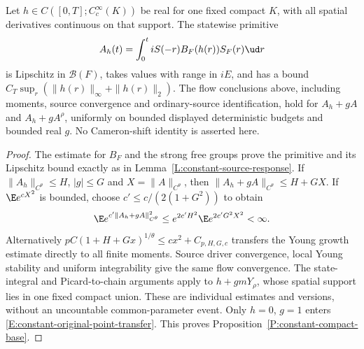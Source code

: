 \begin{proposition}\label{P:constant-compact-base}
  Let $h\in C([0,T];C_c^\infty(K))$ be real for one fixed compact
  $K$, with all spatial derivatives continuous on that support.
  The statewise primitive
  \[
    A_h(t)=\int_0^t iS(-r)B_F(h(r))S_F(r)\ud r
  \]
  is Lipschitz in $\mathcal B(F)$, takes values with range in $iE$,
  and has a bound $C_T\sup_r(\|h(r)\|_\infty+\|h(r)\|_2)$.
  The flow conclusions above, including moments, source convergence
  and ordinary-source identification, hold for $A_h+gA$ and
  $A_h+gA^\rho$, uniformly on bounded displayed deterministic budgets
  and bounded real $g$. No Cameron-shift identity is asserted here.
\end{proposition}

\begin{proof}
  The estimate for $B_F$ and the strong free groups prove the primitive
  and its Lipschitz bound exactly as in
  Lemma~\ref{L:constant-source-response}. If
  $\|A_h\|_{C^\theta}\le H$, $|g|\le G$ and $X=\|A\|_{C^\theta}$,
  then $\|A_h+gA\|_{C^\theta}\le H+GX$. If $\E e^{cX^2}$ is bounded,
  choose $c'\le c/(2(1+G^2))$ to obtain
  \[
    \E e^{c'\|A_h+gA\|_{C^\theta}^2}
    \le e^{2c'H^2}\E e^{2c'G^2X^2}<\infty.
  \]
  Alternatively $pC(1+H+Gx)^{1/\theta}\le cx^2+C_{p,H,G,c}$
  transfers the Young growth estimate directly to all finite moments.
  Source driver convergence, local Young stability and uniform
  integrability give the same flow convergence. The state-integral
  and Picard-to-chain arguments apply to $h+gmY_\rho$, whose spatial
  support lies in one fixed compact union. These are individual
  estimates and versions, without an uncountable common-parameter
  event. Only $h=0$, $g=1$ enters
  \eqref{E:constant-original-point-transfer}.
  This proves Proposition~\ref{P:constant-compact-base}.
\end{proof}
